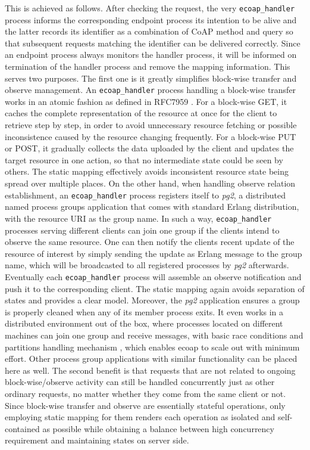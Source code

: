 This is achieved as follows. After checking the request, the very \verb|ecoap_handler| process informs the corresponding endpoint process its intention to be alive and the latter records its identifier as a combination of CoAP method and query so that subsequent requests matching the identifier can be delivered correctly. Since an endpoint process always monitors the handler process, it will be informed on termination of the handler process and remove the mapping information. This serves two purposes. The first one is it greatly simplifies block-wise transfer and observe management. An \verb|ecoap_handler| process handling a block-wise transfer works in an atomic fashion as defined in RFC7959 \autocite{blockwise}. For a block-wise GET, it caches the complete representation of the resource at once for the client to retrieve step by step, in order to avoid unnecessary resource fetching or possible inconsistence caused by the resource changing frequently. For a block-wise PUT or POST,  it gradually collects the data uploaded by the client and updates the target resource in one action, so that no intermediate state could be seen by others. The static mapping effectively avoids inconsistent resource state being spread over multiple places. On the other hand, when handling observe relation establishment, an \verb|ecoap_handler| process registers itself to \textit{pg2}, a distributed named process groups application that comes with standard Erlang distribution, with the resource URI as the group name. In such a way, \verb|ecoap_handler| processes serving different clients can join one group if the clients intend to observe the same resource. One can then notify the clients recent update of the resource of interest by simply sending the update as Erlang message to the group name, which will be broadcasted to all registered processes by \textit{pg2} afterwards. Eventually each \verb|ecoap_handler| process will assemble an observe notification and push it to the corresponding client. The static mapping again avoids separation of states and provides a clear model. Moreover, the \textit{pg2} application ensures a group is properly cleaned when any of its member process exits. It even works in a distributed environment out of the box, where processes located on different machines can join one group and receive messages, with basic race conditions and partitions handling mechanism \autocite{pg2_failure}, which enables ecoap to scale out with minimum effort. Other process group applications with similar functionality can be placed here as well. The second benefit is that requests that are not related to ongoing block-wise/observe activity can still be handled concurrently just as other ordinary requests, no matter whether they come from the same client or not. Since block-wise transfer and observe are essentially stateful operations, only employing static mapping for them renders each operation as isolated and self-contained as possible while obtaining a balance between high concurrency requirement and maintaining states on server side.

